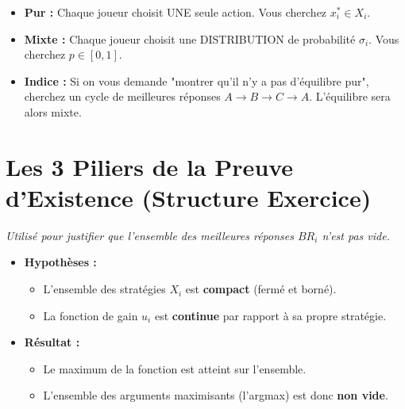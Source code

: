 \documentclass[10pt,a4paper]{article}
\begin{document}
\begin{tcolorbox}[colback=purple!5,title=Distinction : Équilibre Pur vs Mixte]
\begin{itemize}
    \item \textbf{Pur :} Chaque joueur choisit UNE seule action. Vous cherchez $x_i^* \in X_i$.
    \item \textbf{Mixte :} Chaque joueur choisit une DISTRIBUTION de probabilité $\sigma_i$. Vous cherchez $p \in [0,1]$.
    \item \textbf{Indice :} Si on vous demande "montrer qu'il n'y a pas d'équilibre pur", cherchez un cycle de meilleures réponses $A \to B \to C \to A$. L'équilibre sera alors mixte.
\end{itemize}
\end{tcolorbox}

\section{Les 3 Piliers de la Preuve d'Existence (Structure Exercice)}

\begin{tcolorbox}[colback=white, title=\textbf{1. Théorème de Weierstrass (Extremum)}]
\textit{Utilisé pour justifier que l'ensemble des meilleures réponses $BR_i$ n'est pas vide.}
\begin{itemize}
    \item \textbf{Hypothèses :}
    \begin{itemize}
        \item L'ensemble des stratégies $X_i$ est \textbf{compact} (fermé et borné).
        \item La fonction de gain $u_i$ est \textbf{continue} par rapport à sa propre stratégie.
    \end{itemize}
    \item \textbf{Résultat :}
    \begin{itemize}
        \item Le maximum de la fonction est atteint sur l'ensemble.
        \item L'ensemble des arguments maximisants (l'argmax) est donc \textbf{non vide}.
    \end{itemize}
\end{itemize}
\end{tcolorbox}
\end{document}
